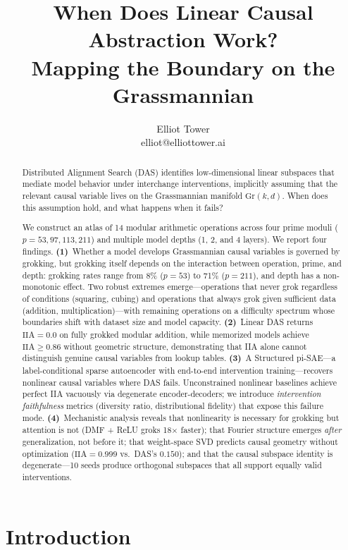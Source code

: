 \documentclass{article}
\title{When Does Linear Causal Abstraction Work?\\
Mapping the Boundary on the Grassmannian}
\author{
\name Elliot Tower \\
\email elliot@elliottower.ai
}
\newcommand{\Gr}{\mathrm{Gr}}
\newcommand{\IIA}{\mathrm{IIA}}
\begin{document}
\maketitle

\begin{abstract}
Distributed Alignment Search (DAS) identifies low-dimensional linear subspaces
that mediate model behavior under interchange interventions, implicitly assuming
that the relevant causal variable lives on the Grassmannian manifold
$\Gr(k,d)$. When does this assumption hold, and what happens when it fails?

We construct an atlas of 14 modular arithmetic operations across four prime
moduli ($p = 53, 97, 113, 211$) and multiple model depths (1, 2, and 4
layers). We report four findings.
\textbf{(1)}~Whether a model develops Grassmannian causal variables is
governed by grokking, but grokking itself depends on the interaction between
operation, prime, and depth: grokking rates range from 8\% ($p{=}53$) to
71\% ($p{=}211$), and depth has a non-monotonic effect. Two robust extremes
emerge---operations that never grok regardless of conditions (squaring,
cubing) and operations that always grok given sufficient data
(addition, multiplication)---with remaining operations on a difficulty
spectrum whose boundaries shift with dataset size and model capacity.
\textbf{(2)}~Linear DAS returns $\IIA = 0.0$ on fully grokked modular
addition, while memorized models achieve $\IIA \geq 0.86$ without geometric
structure, demonstrating that IIA alone cannot distinguish genuine causal
variables from lookup tables.
\textbf{(3)}~A Structured pi-SAE---a label-conditional sparse autoencoder
with end-to-end intervention training---recovers nonlinear causal variables
where DAS fails. Unconstrained nonlinear baselines achieve perfect IIA
vacuously via degenerate encoder-decoders; we introduce \emph{intervention
faithfulness} metrics (diversity ratio, distributional fidelity) that expose
this failure mode.
\textbf{(4)}~Mechanistic analysis reveals that nonlinearity is necessary for
grokking but attention is not (DMF + ReLU groks 18$\times$ faster); that
Fourier structure emerges \emph{after} generalization, not before it; that
weight-space SVD predicts causal geometry without optimization
($\IIA = 0.999$ vs.\ DAS's $0.150$); and that the causal subspace identity
is degenerate---10 seeds produce orthogonal subspaces that all support
equally valid interventions.
\end{abstract}

\section{Introduction}
\label{sec:intro}
\end{document}
